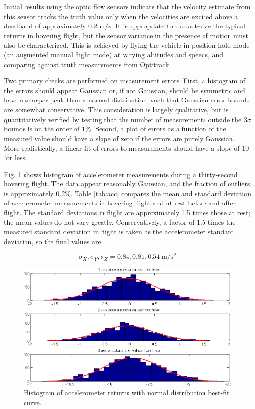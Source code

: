 \documentclass{article}
\newcommand{\degree}{\ensuremath{^\circ}}
\begin{document}
Initial results using the optic flow sensors indicate that the velocity estimate from this sensor tracks the truth value only when the velocities are excited above a deadband of approximately 0.2 m/s. It is appropriate to characterize the typical returns in hovering flight, but the sensor variance in the presence of motion must also be characterized. This is achieved by flying the vehicle in position hold mode (an augmented manual flight mode) at varying altitudes and speeds, and comparing against truth measurements from Optitrack. 

Two primary checks are performed on measurement errors. First, a histogram of the errors should appear Gaussian or, if not Gaussian, should be symmetric and have a sharper peak than a normal distribution, such that Gaussian error bounds are somewhat conservative. This consideration is largely qualitative, but is quantitatively verified by testing that the number of measurements outside the $3\sigma$ bounds is on the order of 1\%. Second, a plot of errors as a function of the measured value should have a slope of zero if the errors are purely Gaussian. More realistically, a linear fit of errors to measurements should have a slope of 10\degree or less.

Fig. \ref{fig:restaccelhist} shows histogram of accelerometer measurements during a thirty-second hovering flight. The data appear reasonably Gaussian, and the fraction of outliers is approximately 0.2\%. Table \ref{tab:acc} compares the mean and standard deviation of accelerometer measurements in hovering flight and at rest before and after flight. The standard deviations in flight are approximately 1.5 times those at rest; the mean values do not vary greatly. Conservatively, a factor of 1.5 times the measured standard deviation in flight is taken as the accelerometer standard deviation, so the final values are:

\begin{equation}
\sigma_X,\sigma_Y,\sigma_Z = 0.84,0.81,0.54 \ \mathrm{m/s^2}
\end{equation}

\begin{figure}[tb!]
\centering
\includegraphics[width = \textwidth]{../../sensor characterization/rest_accel_hist.png}
\caption{Histogram of accelerometer returns with normal distribution best-fit curve.}
\label{fig:restaccelhist}
\end{figure}
\end{document}
